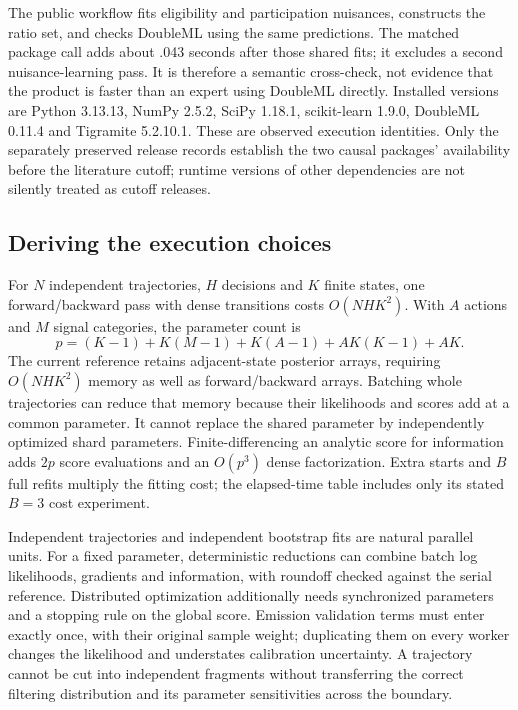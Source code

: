 The public workflow fits eligibility and participation nuisances, constructs
the ratio set, and checks DoubleML using the same predictions. The matched
package call adds about .043 seconds after those shared fits; it excludes a
second nuisance-learning pass. It is therefore a semantic cross-check, not
evidence that the product is faster than an expert using DoubleML directly.
Installed versions are Python 3.13.13, NumPy 2.5.2, SciPy 1.18.1,
scikit-learn 1.9.0, DoubleML 0.11.4 and Tigramite 5.2.10.1. These are observed
execution identities. Only the separately preserved release records establish
the two causal packages' availability before the literature cutoff; runtime
versions of other dependencies are not silently treated as cutoff releases.

\subsection{Deriving the execution choices}
For $N$ independent trajectories, $H$ decisions and $K$ finite states, one
forward/backward pass with dense transitions costs $O(NHK^2)$. With $A$
actions and $M$ signal categories, the parameter count is
\[
 p=(K-1)+K(M-1)+K(A-1)+AK(K-1)+AK.
\]
The current reference retains adjacent-state posterior arrays, requiring
$O(NHK^2)$ memory as well as forward/backward arrays. Batching whole
trajectories can reduce that memory because their likelihoods and scores
add at a common parameter. It cannot replace the shared parameter by
independently optimized shard parameters. Finite-differencing an analytic
score for information adds $2p$ score evaluations and an $O(p^3)$ dense
factorization. Extra starts and $B$ full refits multiply the fitting cost;
the elapsed-time table includes only its stated $B=3$ cost experiment.

Independent trajectories and independent bootstrap fits are natural
parallel units. For a fixed parameter, deterministic reductions can combine
batch log likelihoods, gradients and information, with roundoff checked
against the serial reference. Distributed optimization additionally needs
synchronized parameters and a stopping rule on the global score. Emission
validation terms must enter exactly once, with their original sample weight;
duplicating them on every worker changes the likelihood and understates
calibration uncertainty. A trajectory cannot be cut into independent
fragments without transferring the correct filtering distribution and its
parameter sensitivities across the boundary.

